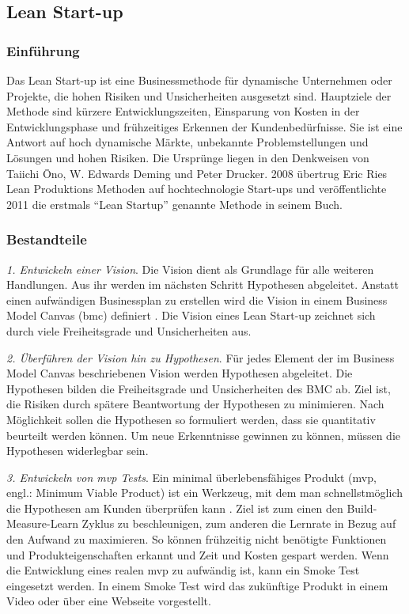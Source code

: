 \subsection{Lean Start-up}
\subsubsection*{Einführung}
Das Lean Start-up ist eine Businessmethode für dynamische Unternehmen oder Projekte, die hohen Risiken und Unsicherheiten ausgesetzt sind. 
Hauptziele der Methode sind kürzere Entwicklungszeiten, Einsparung von Kosten in der Entwicklungsphase und frühzeitiges Erkennen der Kundenbedürfnisse. 
Sie ist eine Antwort auf hoch dynamische Märkte, unbekannte Problemstellungen und Lösungen und hohen Risiken. Die Ursprünge liegen in den Denkweisen von Taiichi Ōno, W. Edwards Deming und Peter Drucker. 
2008 übertrug Eric Ries Lean Produktions Methoden auf hochtechnologie Start-ups und veröffentlichte 2011 die erstmals ``Lean Startup'' 
genannte Methode in seinem Buch. %


\subsubsection*{Bestandteile}

\textit{1. Entwickeln einer Vision}. Die Vision dient als Grundlage für alle weiteren Handlungen. Aus ihr werden im nächsten Schritt Hypothesen abgeleitet. Anstatt einen aufwändigen Businessplan zu erstellen wird die Vision in einem Business Model Canvas (\gls{bmc}) definiert \cite{Blank2013}. Die Vision eines Lean Start-up zeichnet sich durch viele Freiheitsgrade und Unsicherheiten aus. 

\textit{2. Überführen der Vision hin zu Hypothesen}. Für jedes Element der im Business Model Canvas beschriebenen Vision werden Hypothesen abgeleitet. Die Hypothesen bilden die Freiheitsgrade und Unsicherheiten des BMC ab. Ziel ist, die Risiken durch spätere Beantwortung der Hypothesen zu minimieren. Nach Möglichkeit sollen die Hypothesen so formuliert werden, dass sie quantitativ beurteilt werden können. Um neue Erkenntnisse gewinnen zu können, müssen die Hypothesen widerlegbar sein. 

\textit{3. Entwickeln von \gls{mvp} Tests}. Ein minimal überlebensfähiges Produkt (\gls{mvp}, engl.: Minimum Viable Product) ist ein Werkzeug, mit dem man schnellstmöglich die Hypothesen am Kunden überprüfen kann \cite[93]{Ries2011}. Ziel ist zum einen den Build-Measure-Learn Zyklus zu beschleunigen, zum anderen die Lernrate in Bezug auf den Aufwand zu maximieren. So können frühzeitig nicht benötigte Funktionen und Produkteigenschaften erkannt und Zeit und Kosten gespart werden. Wenn die Entwicklung eines realen \gls{mvp} zu aufwändig ist, kann ein Smoke Test eingesetzt werden. In einem Smoke Test wird das zukünftige Produkt in einem Video oder über eine Webseite vorgestellt.

